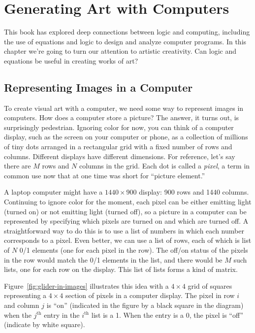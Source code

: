\chapter{Generating Art with Computers}
\label{ch:art-computers}

This book has explored deep connections between logic
and computing, including the use of equations and logic to
design and analyze computer programs. In this chapter we're going
to turn our attention to artistic creativity. Can logic and
equations be useful in creating works of art?

\section{Representing Images in a Computer}

To create visual art with a computer, we need some way to
represent images in computers. How does a computer
store a picture?
The answer, it turns out, is surprisingly pedestrian. Ignoring
color for now, you can think of a computer display, such as the
screen on your computer or phone, as a collection of millions
of tiny dots arranged in a rectangular grid with a fixed number
of rows and columns. Different displays have different dimensions.
For reference, let's say there are $M$ rows and $N$ columns
in the grid.
Each dot is called a \emph{pixel}, a term in common use now
that at one time was short for ``picture element.''

A laptop computer might have
a $1440\times900$ display: 900 rows and 1440 columns.
Continuing to ignore color for the moment, each pixel can
be either emitting light (turned on) or not emitting light
(turned off), so a picture in a computer can be represented
by specifying which pixels are turned on and which are turned off.
A straightforward way to do this is to use a list of
numbers in which each number corresponds to a pixel. Even better,
we can use a list of rows, each of which is list of $N$
0/1 elements (one for each pixel in the row).
The off/on status of the pixels in the row would
match the 0/1 elements in the list,
and there would be $M$ such lists, one for each row on the display.
This list of lists forms a kind of matrix.

Figure~\ref{fig:glider-in-images} illustrates
this idea with a $4\times4$ grid of squares
representing a $4\times4$ section of pixels in a computer display.
The pixel in row $i$ and column $j$ is ``on''
(indicated in the figure by a black square in the diagram)
when the $j^\text{th}$
entry in the $i^\text{th}$ list is a 1.
When the entry is a 0, the pixel is ``off'' (indicate by white square).

